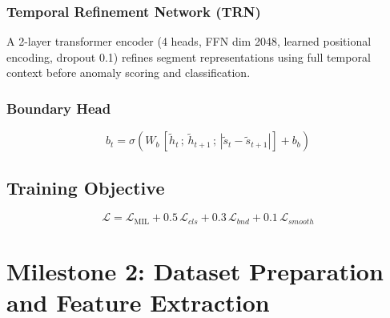 \documentclass[11pt]{article}
\begin{document}
\subsubsection{Temporal Refinement Network (TRN)}
A 2-layer transformer encoder (4 heads, FFN dim 2048, learned positional encoding, dropout 0.1) refines segment representations using full temporal context before anomaly scoring and classification.

\subsubsection{Boundary Head}
\begin{equation}
b_t = \sigma\!\left(W_b\, [\tilde{h}_t\,;\,\tilde{h}_{t+1}\,;\,|\tilde{s}_t - \tilde{s}_{t+1}|] + b_b\right)
\end{equation}

\subsection{Training Objective}
\begin{equation}
\mathcal{L} = \mathcal{L}_\text{MIL} + 0.5\,\mathcal{L}_{cls} + 0.3\,\mathcal{L}_{bnd} + 0.1\,\mathcal{L}_{smooth}
\end{equation}



\section{Milestone 2: Dataset Preparation and Feature Extraction}
\end{document}
